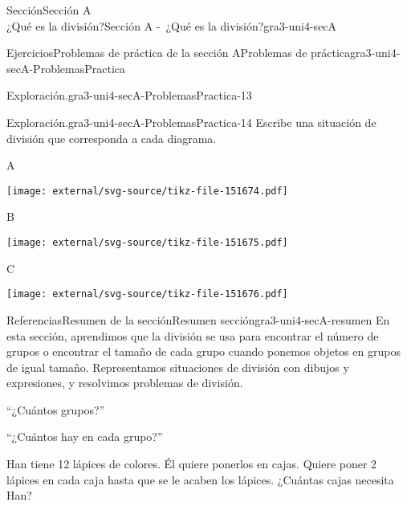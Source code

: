 \begin{sectionptx}{Sección}{{\Large Sección A\\}¿Qué es la división?}{}{Sección A -~¿Qué es la división?}{}{}{gra3-uni4-secA}
\begin{exercises-subsection}{Ejercicios}{Problemas de práctica de la sección A}{}{Problemas de práctica}{}{}{gra3-uni4-secA-ProblemasPractica}
\begin{divisionexercise}{11}{Exploración.}{}{gra3-uni4-secA-ProblemasPractica-13}
\begin{enumerate}[label={(\alph*)}]
\end{enumerate}
%
\end{divisionexercise}%
\begin{divisionexercise}{12}{Exploración.}{}{gra3-uni4-secA-ProblemasPractica-14}%
Escribe una situación de división que corresponda a cada diagrama.%
\begin{sidebyside}{3}{0}{0}{0.02}%
\begin{sbspanel}{0.32}%
A%
\par
\texttt{[image: external/svg-source/tikz-file-151674.pdf]}
\end{sbspanel}%
\begin{sbspanel}{0.32}%
B%
\par
\texttt{[image: external/svg-source/tikz-file-151675.pdf]}
\end{sbspanel}%
\begin{sbspanel}{0.32}%
C%
\par
\texttt{[image: external/svg-source/tikz-file-151676.pdf]}
\end{sbspanel}%
\end{sidebyside}%
\end{divisionexercise}%
\end{exercises-subsection}
%
%
\typeout{************************************************}
\typeout{************************************************}
%
\begin{references-subsection}{Referencias}{Resumen de la sección}{}{Resumen sección}{}{}{gra3-uni4-secA-resumen}
En esta sección, aprendimos que la división se usa para encontrar el número de grupos o encontrar el tamaño de cada grupo cuando ponemos objetos en grupos de igual tamaño. Representamos situaciones de división con dibujos y expresiones, y resolvimos problemas de división.%
\begin{sidebyside}{2}{0.025}{0.025}{0.05}%
\begin{sbspanel}{0.45}%
``¿Cuántos grupos?''%
\end{sbspanel}%
\begin{sbspanel}{0.45}%
\par
``¿Cuántos hay en cada grupo?''%
\end{sbspanel}%
\end{sidebyside}%
\begin{sidebyside}{2}{0.025}{0.025}{0.05}%
\begin{sbspanel}{0.45}%
Han tiene 12 lápices de colores. Él quiere ponerlos en cajas. Quiere poner 2 lápices en cada caja hasta que se le acaben los lápices. ¿Cuántas cajas necesita Han?%

\end{sbspanel}
\end{sidebyside}
\end{references-subsection}
\end{sectionptx}
